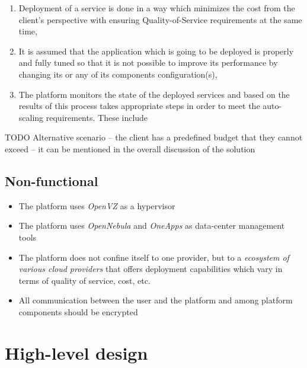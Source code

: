 \begin{enumerate}
\begin{itemize}
\begin{inparaenum}[i)]
      \end{inparaenum}
    \end{itemize}
  \item Deployment of a service is done in a way which minimizes the cost from the client's perspective with ensuring Quality-of-Service requirements at the same time,
  \item It is assumed that the application which is going to be deployed is properly and fully tuned so that it is not possible to improve its performance by changing its or any of its components configuration(s),
  \item The platform monitors the state of the deployed services and based on the results of this process takes appropriate steps in order to meet the auto-scaling requirements. These include
\end{enumerate}

TODO Alternative scenario -- the client has a predefined budget that they cannot exceed -- it can be mentioned in the overall discussion of the solution

\subsection{Non-functional}
\begin{itemize}
  \item The platform uses \emph{OpenVZ} as a hypervisor
  \item The platform uses \emph{OpenNebula} and \emph{OneApps} as data-center management tools
  \item The platform does not confine itself to one provider, but to a \emph{ecosystem of various cloud providers} that offers deployment capabilities which vary in terms of quality of service, cost, etc.
  \item All communication between the user and the platform and among platform components should be encrypted
\end{itemize}

\section{High-level design}
